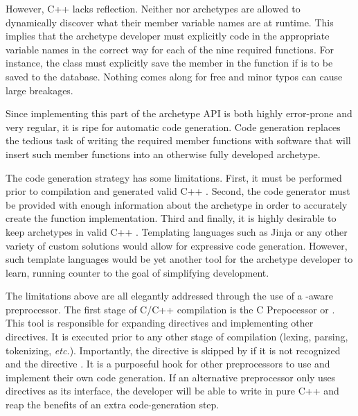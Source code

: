 However, C++ lacks reflection. Neither  nor archetypes are allowed
to dynamically discover what their member variable names are at runtime.  This 
implies that the archetype developer must explicitly code in the appropriate variable
names in the correct way for each of the nine required functions.  For instance, 
the  class must explicitly save the  member in the 
 function if  is to be saved to the database.
Nothing comes along for free and minor typos can cause large breakages. 

Since implementing this part of the archetype \gls{API} is both highly error-prone and 
very regular, it is ripe for automatic code generation. Code generation replaces the 
tedious task of writing the required member functions with software that will 
insert such member functions into an otherwise fully developed archetype. 

The code generation strategy has some limitations. First, it must be 
performed prior to compilation and generated valid C++ . Second, the
code generator must be provided with enough information about the archetype in 
order to accurately create the function implementation. Third and finally, it 
is highly desirable to keep archetypes in valid C++ . Templating languages 
such as Jinja  or any other variety of custom solutions would allow for 
expressive code generation. However, such template languages would be yet another 
tool for the archetype developer to learn, running counter to the goal of 
simplifying development.

The limitations above are all elegantly addressed through the use of a 
\cyclus-aware preprocessor. The first stage of C/C++ compilation is the 
C Prepocessor or  . This tool is responsible for expanding 
 directives and implementing other \code{#} directives. It is executed
prior to any other stage of compilation (lexing, parsing, tokenizing, \emph{etc.}).
Importantly, the  directive is skipped by  if it is not 
recognized and the directive . It is a
purposeful hook for other preprocessors to use and implement their own code generation.
If an alternative preprocessor only uses  directives as its interface, 
the developer will be able to write in pure C++ and reap the benefits
of an extra code-generation step. 

